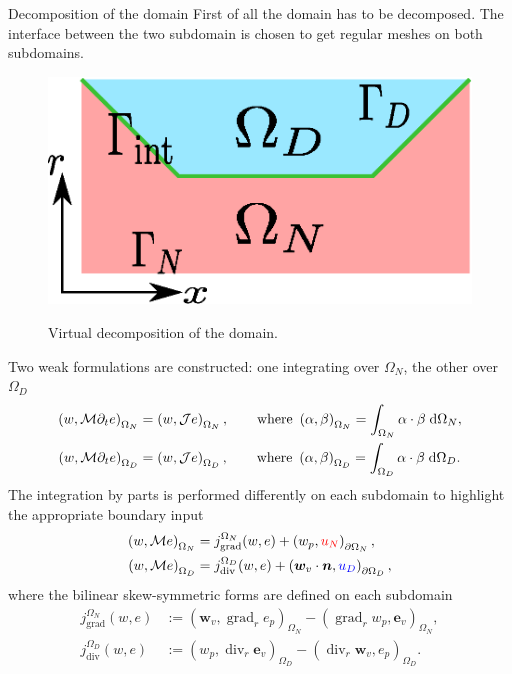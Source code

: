 \documentclass[aspectratio=169]{ISAE-Beamer}
\DeclareMathOperator*{\grad}{grad}
\renewcommand{\div}{\operatorname{div}}
\begin{document}
\begin{frame}{Decomposition of the domain}
First of all the domain has to be decomposed. The interface between the two subdomain is chosen to get regular meshes on both subdomains.
\begin{figure}[t]%
	\centering
	\includegraphics[width=0.5\columnwidth]{domain_split.eps} \\
	\caption{Virtual decomposition of the domain.}
\end{figure}
\end{frame}

\begin{frame}
	Two weak formulations are constructed: one integrating over $\Omega_N$, the other over $\Omega_D$
	\begin{align*}
	\left(w, \mathcal{M} \partial_t{e} \right)_{\Omega_N} &= \left(w, \mathcal{J} e \right)_{\Omega_{N}}, \qquad \text{where } \left(\alpha, \beta \right)_{\Omega_N} = \int_{\Omega_{N}} \alpha \cdot \beta \d{\Omega_{N}}, \\
	\left(w, \mathcal{M} \partial_t{e} \right)_{\Omega_D} &= \left(w, \mathcal{J} e \right)_{\Omega_{D}}, \qquad \text{where } \left(\alpha, \beta \right)_{\Omega_D} = \int_{\Omega_{D}} \alpha \cdot \beta \d{\Omega_{D}}.
	\end{align*}
	The integration by parts is performed differently on each subdomain to highlight the appropriate boundary input
	\begin{equation*}
	\begin{aligned}
	\left(w, \mathcal{M} e \right)_{\Omega_{N}} &= j_{\text{grad}}^{\Omega_N}(w, e) + \left(w_p, \textcolor{red}{u_N} \right)_{\partial \Omega_N}, \\
	\left(w, \mathcal{M} e \right)_{\Omega_{D}} &= j_{\text{div}}^{\Omega_D}(w, e) + \left(\bm{w}_v \cdot \bm{n}, \textcolor{blue}{u_D} \right)_{\partial \Omega_D},  \\
	\end{aligned} 
	\end{equation*}
where the bilinear skew-symmetric forms are defined on each subdomain
\begin{equation*}
	\begin{aligned}
	j_{\text{grad}}^{\Omega_{N}}(w, e) &:= \left(\bm{w}_v, {\grad}_r e_p \right)_{\Omega_{N}} - \left({\grad}_r w_p, \bm{e}_v \right)_{\Omega_{N}}, \\
	j_{\text{div}}^{\Omega_{D}}(w, e) &:= \left(w_p, \div_r \bm{e}_v \right)_{\Omega_{D}} - \left(\div_r \bm{w}_v, e_p \right)_{\Omega_{D}}.
	\end{aligned}
\end{equation*}
\end{frame}
\end{document}
